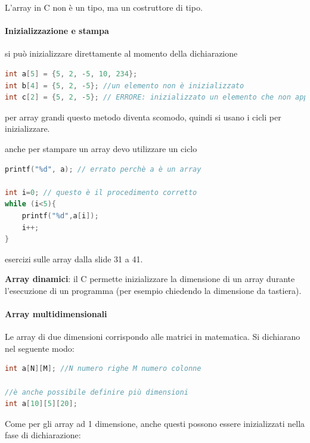 \documentclass[
  paper=a4,
  oneside  ,captions=tableheading
]{scrbook}
\begin{document}
L'array in C non è un tipo, ma un costruttore di tipo.

\hypertarget{inizializzazione-e-stampa}{%
\paragraph{Inizializzazione e stampa}\label{inizializzazione-e-stampa}}

si può inizializzare direttamente al momento della dichiarazione

\begin{lstlisting}[language={C++}]
int a[5] = {5, 2, -5, 10, 234};
int b[4] = {5, 2, -5}; //un elemento non è inizializzato
int c[2] = {5, 2, -5}; // ERRORE: inizializzato un elemento che non appartiene all'array
\end{lstlisting}

per array grandi questo metodo diventa scomodo, quindi si usano i cicli
per inizializzare.

anche per stampare un array devo utilizzare un ciclo

\begin{lstlisting}[language={C++}]
printf("%d", a); // errato perchè a è un array

int i=0; // questo è il procedimento corretto
while (i<5){
    printf("%d",a[i]);
    i++;
} 
\end{lstlisting}

esercizi sulle array dalla slide 31 a 41.

\textbf{Array dinamici}: il C permette inizializzare la dimensione di un
array durante l'esecuzione di un programma (per esempio chiedendo la
dimensione da tastiera).

\hypertarget{array-multidimensionali}{%
\paragraph{Array multidimensionali}\label{array-multidimensionali}}

Le array di due dimensioni corrispondo alle matrici in matematica. Si
dichiarano nel seguente modo:

\begin{lstlisting}[language={C++}]
int a[N][M]; //N numero righe M numero colonne

//è anche possibile definire più dimensioni
int a[10][5][20];
\end{lstlisting}

Come per gli array ad 1 dimensione, anche questi possono essere
inizializzati nella fase di dichiarazione:
\end{document}
